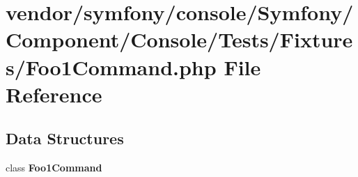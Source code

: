 \section{vendor/symfony/console/\+Symfony/\+Component/\+Console/\+Tests/\+Fixtures/\+Foo1\+Command.php File Reference}
\label{_foo1_command_8php}
\subsection*{Data Structures}
\begin{DoxyCompactItemize}
\item 
class {\bf Foo1\+Command}
\end{DoxyCompactItemize}

